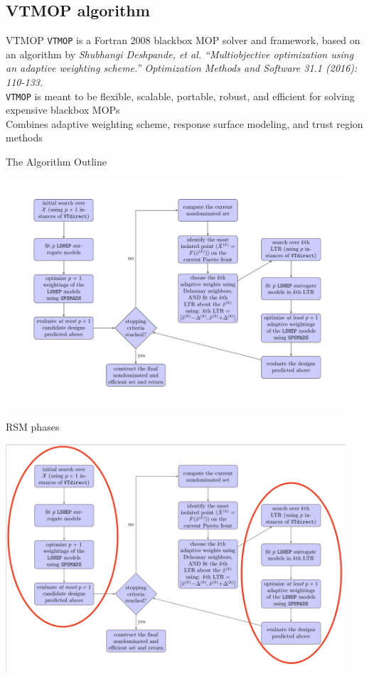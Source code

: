 \documentclass[xcolor=dvipsnames]{beamer}
\begin{document}
\subsection{VTMOP algorithm}
\begin{frame}{VTMOP}
\texttt{VTMOP} is a Fortran 2008 blackbox MOP solver and framework,
based on an algorithm by
{ \small \it Shubhangi Deshpande, et al.
``Multiobjective optimization using an adaptive weighting scheme.''
Optimization Methods and Software 31.1 (2016): 110-133.}\\
\medskip
{\tt VTMOP} is meant to be flexible, scalable, portable, robust, and
efficient for solving expensive blackbox MOPs\\
\medskip
Combines adaptive weighting scheme, response surface modeling, and trust
region methods
\end{frame}
\begin{frame}{The Algorithm Outline}
\begin{center}
\includegraphics[width=0.95\textwidth]{algorithm-chart.pdf}
\end{center}
\end{frame}
\begin{frame}{RSM phases}
\begin{center}
\includegraphics[width=0.95\textwidth]{rsm-chart.png}
\end{center}
\end{frame}
\end{document}
